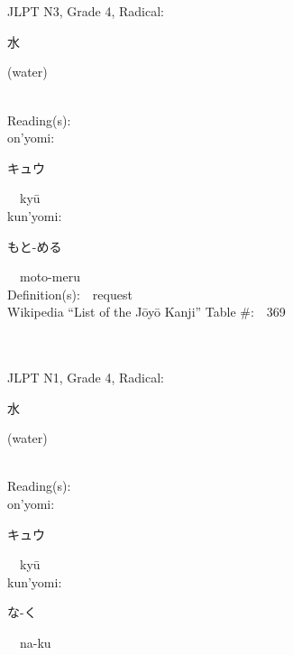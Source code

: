 \begin{multicols}{2}
\ \ \\
{\fontsize{34pt}{40pt}  }\ \ \\  %
{JLPT N3, Grade 4, Radical:\ \ {\begin{CJK}{UTF8}{min} 水 \end{CJK}} (water) } \\
Reading(s):\ \ \\
{\hspace*{1em}}on'yomi:\ \ \\
{\hspace*{2em}}{\begin{CJK}{UTF8}{min} キュウ \end{CJK}}\ \ ky\=u\ \ \\
{\hspace*{1em}}kun'yomi:\ \ \\
{\hspace*{2em}}{\begin{CJK}{UTF8}{min} もと-める \end{CJK}}\ \ moto-meru\ \ \\
Definition(s):\ \ request \\
Wikipedia ``List of the J\=oy\=o Kanji'' Table \#:\ \ 369 \\
\ \ \\
{\fontsize{34pt}{40pt}  }\ \ \\  %
{JLPT N1, Grade 4, Radical:\ \ {\begin{CJK}{UTF8}{min} 水 \end{CJK}} (water) } \\
Reading(s):\ \ \\
{\hspace*{1em}}on'yomi:\ \ \\
{\hspace*{2em}}{\begin{CJK}{UTF8}{min} キュウ \end{CJK}}\ \ ky\=u\ \ \\
{\hspace*{1em}}kun'yomi:\ \ \\
{\hspace*{2em}}{\begin{CJK}{UTF8}{min} な-く \end{CJK}}\ \ na-ku\ \ \\

\end{multicols}
